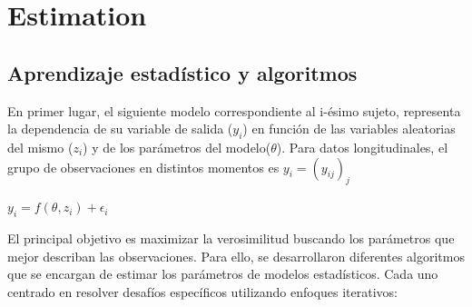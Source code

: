 \documentclass[12pt]{article}
\begin{document}
\section{Estimation}
\subsection{Aprendizaje estadístico y algoritmos}
En primer lugar, el siguiente modelo correspondiente al i-ésimo sujeto, representa la dependencia de su variable de salida ($y_{i}$) en función de las variables aleatorias del mismo ($z_{i}$) y de los parámetros del modelo($\theta$). Para datos longitudinales, el grupo de observaciones en distintos momentos es $y_{i}=(y_{ij})_{j}$
\begin{center}
	$y_{i}=f(\theta,z_{i})+\epsilon_{i}$
\end{center}

El principal objetivo es maximizar la verosimilitud buscando los parámetros que mejor describan las observaciones. Para ello, se desarrollaron diferentes algoritmos que se encargan de estimar los parámetros de modelos estadísticos. Cada uno centrado en resolver desafíos específicos utilizando enfoques iterativos:
\end{document}
